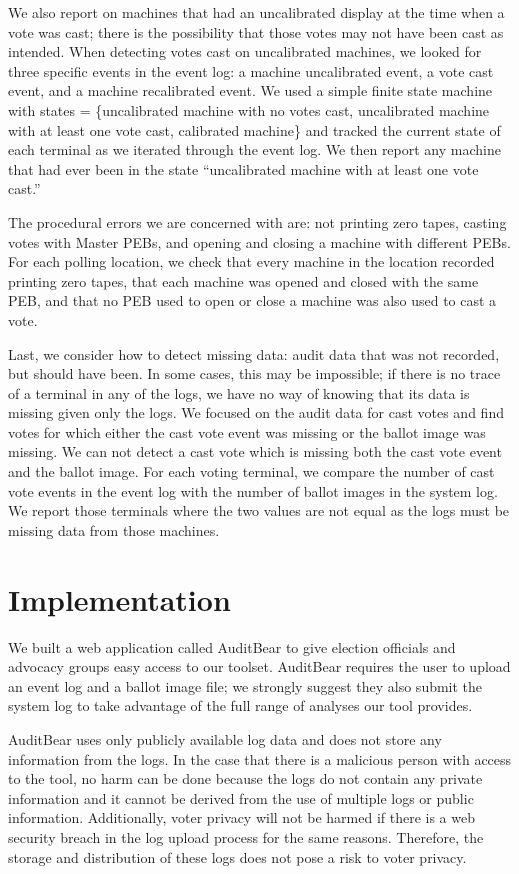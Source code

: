 \documentclass[letterpaper,twocolumn,10pt]{article}
\begin{document}
We also report on machines that had an uncalibrated display at the time when a
vote was cast; there is the possibility that those votes may not have been cast
as intended. When detecting votes cast on uncalibrated machines, we looked for
three specific events in the event log: a machine uncalibrated event, a vote
cast event, and a machine recalibrated event. We used a simple finite state
machine with states = \{uncalibrated machine with no votes cast, uncalibrated
  machine with at least one vote cast, calibrated machine\} and tracked the
current state of each terminal as we iterated through the event log. We then
report any machine that had ever been in the state ``uncalibrated machine with
at least one vote cast.''

The procedural errors we are concerned with are: not printing zero tapes,
casting votes with Master PEBs, and opening and closing a machine with
different PEBs. For each polling location, we check that every machine in the
location recorded printing zero tapes, that each machine was opened and closed
with the same PEB, and that no PEB used to open or close a machine was also used
to cast a vote.

Last, we consider how to detect missing data: audit data that was not recorded,
but should have been. In some cases, this may be impossible; if there is no
trace of a terminal in any of the logs, we have no way of knowing that its data
is missing given only the logs. We focused on the audit data for cast votes and
find votes for which either the cast vote event was missing or the ballot image
was missing. We can not detect a cast vote which is missing both the cast vote
event and the ballot image. For each voting terminal, we compare the number of
cast vote events in the event log with the number of ballot images in the system
log. We report those terminals where the two values are not equal as the logs
must be missing data from those machines.  

\section{Implementation}
We built a web application called AuditBear to give election officials and
advocacy groups easy access to our toolset. AuditBear requires the user to
upload an event log and a ballot image file; we strongly suggest they also
submit the system log to take advantage of the full range of analyses our tool
provides. 

AuditBear uses only publicly available log data and does not store
any information from the logs. In the case that there 
is a malicious person with access to the tool, no harm can be done because the 
logs do not contain any private information and it cannot be derived from the 
use of multiple logs or public information.  Additionally, voter privacy will 
not be harmed if there is a web security breach in the log upload process for 
the same reasons.  Therefore, the storage and distribution of these logs does 
not pose a risk to voter privacy. 
\end{document}

